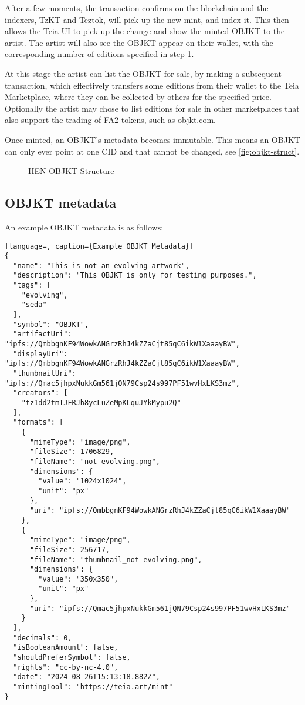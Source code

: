 After a few moments, the transaction confirms on the blockchain and the indexers, TzKT and Teztok, will pick up the new mint, and index it. This then allows the Teia UI to pick up the change and show the minted OBJKT to the artist. The artist will also see the OBJKT appear on their wallet, with the corresponding number of editions specified in step 1.

At this stage the artist can list the OBJKT for sale, by making a subsequent transaction, which effectively transfers some editions from their wallet to the Teia Marketplace, where they can be collected by others for the specified price. Optionally the artist may chose to list editions for sale in other marketplaces that also support the trading of FA2 tokens, such as objkt.com.

Once minted, an OBJKT's metadata becomes immutable. This means an OBJKT can only ever point at one CID and that cannot be changed, see \autoref{fig:objkt-struct}.

\begin{figure}[h]
    \centering
    \captionsetup{justification=centering}
    
    \caption[HEN OBJKT Structure]{HEN OBJKT Structure}
    \label{fig:objkt-struct}
\end{figure}

\subsection{OBJKT metadata}

An example OBJKT metadata is as follows:

\vspace{0.5cm}

\begin{lstlisting}[language=, caption={Example OBJKT Metadata}]
{
  "name": "This is not an evolving artwork",
  "description": "This OBJKT is only for testing purposes.",
  "tags": [
    "evolving",
    "seda"
  ],
  "symbol": "OBJKT",
  "artifactUri": "ipfs://QmbbgnKF94WowkANGrzRhJ4kZZaCjt85qC6ikW1XaaayBW",
  "displayUri": "ipfs://QmbbgnKF94WowkANGrzRhJ4kZZaCjt85qC6ikW1XaaayBW",
  "thumbnailUri": "ipfs://Qmac5jhpxNukkGm561jQN79Csp24s997PF51wvHxLKS3mz",
  "creators": [
    "tz1dd2tmTJFRJh8ycLuZeMpKLquJYkMypu2Q"
  ],
  "formats": [
    {
      "mimeType": "image/png",
      "fileSize": 1706829,
      "fileName": "not-evolving.png",
      "dimensions": {
        "value": "1024x1024",
        "unit": "px"
      },
      "uri": "ipfs://QmbbgnKF94WowkANGrzRhJ4kZZaCjt85qC6ikW1XaaayBW"
    },
    {
      "mimeType": "image/png",
      "fileSize": 256717,
      "fileName": "thumbnail_not-evolving.png",
      "dimensions": {
        "value": "350x350",
        "unit": "px"
      },
      "uri": "ipfs://Qmac5jhpxNukkGm561jQN79Csp24s997PF51wvHxLKS3mz"
    }
  ],
  "decimals": 0,
  "isBooleanAmount": false,
  "shouldPreferSymbol": false,
  "rights": "cc-by-nc-4.0",
  "date": "2024-08-26T15:13:18.882Z",
  "mintingTool": "https://teia.art/mint"
}
\end{lstlisting}

